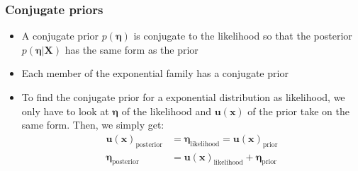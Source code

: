 \subsubsection{Conjugate priors}
\begin{itemize}
	\item A conjugate prior $p(\bm{\eta})$ is conjugate to the likelihood so that the posterior $p(\bm{\eta}|\bm{X})$ has the same form as the prior
	\item Each member of the exponential family has a conjugate prior
	\item To find the conjugate prior for a exponential distribution as likelihood, we only have to look at $\bm{\eta}$ of the likelihood and $\bm{u}(\bm{x})$ of the prior take on the same form. Then, we simply get:
	\begin{equation*}
		\begin{split}
			\bm{u}(\bm{x})_{\text{posterior}} & = \bm{\eta}_{\text{likelihood}} = \bm{u}(\bm{x})_{\text{prior}}\\
			\bm{\eta}_{\text{posterior}} & = \bm{u}(\bm{x})_{\text{likelihood}} + \bm{\eta}_{\text{prior}}
		\end{split}
	\end{equation*}
\end{itemize}
